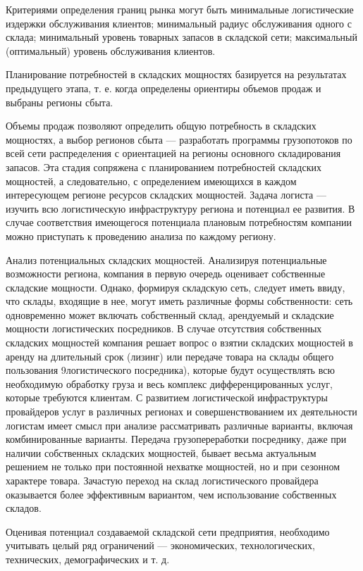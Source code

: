 Критериями определения границ рынка могут быть минимальные логистические издержки обслуживания клиентов; минимальный радиус обслуживания одного с склада; минимальный уровень товарных запасов в складской сети; максимальный (оптимальный) уровень обслуживания клиентов.

Планирование потребностей в складских мощностях базируется на результатах предыдущего этапа, т. е. когда определены ориентиры объемов продаж и выбраны регионы сбыта.

Объемы продаж позволяют определить общую потребность в складских мощностях, а выбор регионов сбыта --- разработать программы грузопотоков по всей сети распределения с ориентацией на регионы основного складирования запасов.
Эта стадия сопряжена с планированием потребностей складских мощностей, а следовательно, с определением имеющихся в каждом интересующем регионе ресурсов складских мощностей.
Задача логиста --- изучить всю логистическую инфраструктуру региона и потенциал ее развития.
В случае соответствия имеющегося потенциала плановым потребностям компании можно приступать к проведению анализа по каждому региону.

Анализ потенциальных складских мощностей.
Анализируя потенциальные возможности региона, компания в первую очередь оценивает собственные складские мощности.
Однако, формируя складскую сеть, следует иметь ввиду, что склады, входящие в нее, могут иметь различные формы собственности: сеть одновременно может включать собственный склад, арендуемый и складские мощности логистических посредников.
В случае отсутствия собственных складских мощностей компания решает вопрос о взятии складских мощностей в аренду на длительный срок (лизинг) или передаче товара на склады общего пользования 9логистического посредника), которые будут осуществлять всю необходимую обработку груза и весь комплекс дифференцированных услуг, которые требуются клиентам.
С развитием логистической инфраструктуры провайдеров услуг в различных регионах и совершенствованием их деятельности логистам имеет смысл при анализе рассматривать различные варианты, включая комбинированные варианты.
Передача грузопереработки посреднику, даже при наличии собственных складских мощностей, бывает весьма актуальным решением не только при постоянной нехватке мощностей, но и при сезонном характере товара.
Зачастую переход на склад логистического провайдера оказывается более эффективным вариантом, чем использование собственных складов.

Оценивая потенциал создаваемой складской сети предприятия, необходимо учитывать целый ряд ограничений --- экономических, технологических, технических, демографических и т. д.

